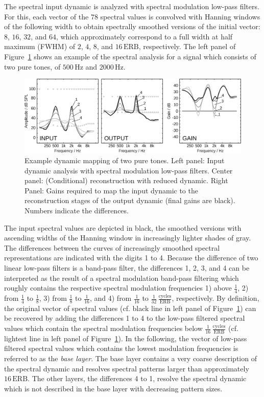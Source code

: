 \documentclass[10pt,a4paper,twocolumn]{article}
\begin{document}
The spectral input dynamic is analyzed with spectral modulation low-pass filters.
%
For this, each vector of the $78$ spectral values is convolved with Hanning windows of the following width to obtain spectrally smoothed versions of the initial vector: $8$, $16$, $32$, and $64$, which approximately correspond to a full width at half maximum (FWHM) of $2$, $4$, $8$, and $16\,\text{ERB}$, respectively.
%
The left panel of Figure~\ref{fig:8} shows an example of the spectral analysis for a signal which consists of two pure tones, of $500\,\text{Hz}$ and $2000\,\text{Hz}$.
%
\begin{figure}[h]
	\centerline{\includegraphics[width=.80\textwidth]{images/details-dynamic-layers}}
	\caption{Example dynamic mapping of two pure tones. Left panel: Input dynamic analysis with spectral modulation low-pass filters. Center panel: (Conditional) reconstruction with reduced dynamic. Right Panel: Gains required to map the input dynamic to the reconstruction stages of the output dynamic (final gains are black). Numbers indicate the differences.}
	\label{fig:8}
\end{figure}
%
The input spectral values are depicted in black, the smoothed versions with ascending widths of the Hanning window in increasingly lighter shades of gray.
%
The differences between the curves of increasingly smoothed spectral representations are indicated with the digits 1 to 4.
%
Because the difference of two linear low-pass filters is a band-pass filter, the differences 1, 2, 3, and 4 can be interpreted as the result of a spectral modulation band-pass filtering which roughly contains the respective spectral modulation frequencies 1) above $\frac{1}{4}$, 2) from $\frac{1}{4}$ to $\frac{1}{8}$, 3) from $\frac{1}{8}$ to $\frac{1}{16}$, and 4) from $\frac{1}{16}$ to $\frac{1}{32}$\,$\frac{\text{cycles}}{\text{ERB}}$, respectively.
%
By definition, the original vector of spectral values (cf. black line in left panel of Figure~\ref{fig:8}) can be recovered by adding the differences 1 to 4 to the low-pass filtered spectral values which contain the spectral modulation frequencies below $\frac{1}{16}$\,$\frac{\text{cycles}}{\text{ERB}}$ (cf. lightest line in left panel of Figure~\ref{fig:8}).
%
In the following, the vector of low-pass filtered spectral values which contains the lowest modulation frequencies is referred to as the \emph{base layer}.
%
The base layer contains a very coarse description of the spectral dynamic and resolves spectral patterns larger than approximately $16\,\text{ERB}$.
%
The other layers, the differences 4 to 1, resolve the spectral dynamic which is not described in the base layer with decreasing pattern sizes.
\end{document}
